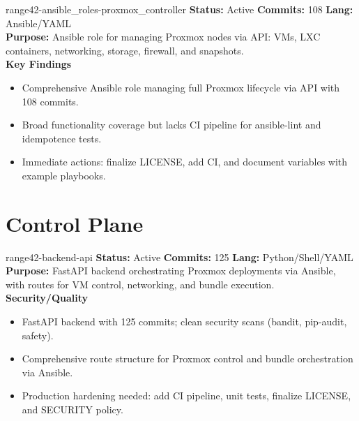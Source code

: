\documentclass[aspectratio=169]{beamer}
\begin{document}
\begin{frame}{range42-ansible\_roles-proxmox\_controller \; \faCogs}
  \textbf{Status:} Active \hfill \textbf{Commits:} 108 \hfill \textbf{Lang:} Ansible/YAML\\[2mm]
  \textbf{Purpose:} Ansible role for managing Proxmox nodes via API: VMs, LXC containers, networking, storage, firewall, and snapshots.\\[2mm]
  \textbf{Key Findings}
  \begin{itemize}
    \item Comprehensive Ansible role managing full Proxmox lifecycle via API with 108 commits.
    \item Broad functionality coverage but lacks CI pipeline for ansible-lint and idempotence tests.
    \item Immediate actions: finalize LICENSE, add CI, and document variables with example playbooks.
  \end{itemize}
\end{frame}

\section{Control Plane}

\begin{frame}{range42-backend-api \; \faProjectDiagram}
  \textbf{Status:} Active \hfill \textbf{Commits:} 125 \hfill \textbf{Lang:} Python/Shell/YAML\\[2mm]
  \textbf{Purpose:} FastAPI backend orchestrating Proxmox deployments via Ansible, with routes for VM control, networking, and bundle execution.\\[2mm]
  \textbf{Security/Quality}
  \begin{itemize}
    \item FastAPI backend with 125 commits; clean security scans (bandit, pip-audit, safety).
    \item Comprehensive route structure for Proxmox control and bundle orchestration via Ansible.
    \item Production hardening needed: add CI pipeline, unit tests, finalize LICENSE, and SECURITY policy.
  \end{itemize}
\end{frame}
\end{document}
